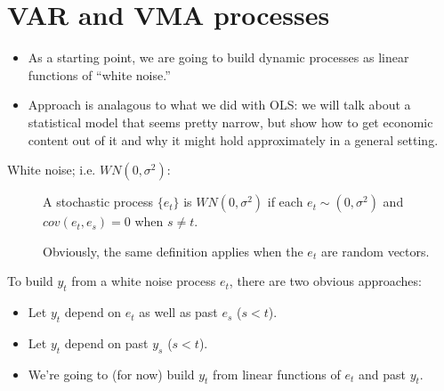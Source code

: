 \section{VAR and VMA processes}

\begin{itemize}
\item As a starting point, we are going to build dynamic processes as
  linear functions of ``white noise.''
\item Approach is analagous to what we did with OLS: we will talk
  about a statistical model that seems pretty narrow, but show how to
  get economic content out of it and why it might hold approximately
  in a general setting.
\end{itemize}

\begin{description}
\item[White noise; i.e. $WN(0,σ^2)$:]
  A stochastic process $\{e_t\}$ is $WN(0, σ^2)$ if each $e_t ∼ (0,
  σ^2)$ and $cov(e_t, e_s) = 0$ when $s ≠ t$.

  Obviously, the same definition applies when the $e_t$ are random
  vectors.
\end{description}

To build $y_t$ from a white noise process $e_t$, there are two obvious
approaches:
\begin{itemize}
\item Let $y_t$ depend on $e_t$ as well as past $e_s$ ($s < t$).
\item Let $y_t$ depend on past $y_s$ ($s < t$).
\item We're going to (for now) build $y_t$ from linear functions of
  $e_t$ and past $y_t$.
\end{itemize}

